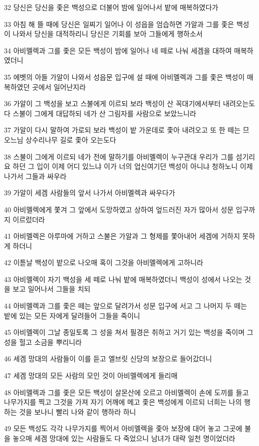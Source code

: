 \par 32 당신은 당신을 좇은 백성으로 더불어 밤에 일어나서 밭에 매복하였다가
\par 33 아침 해 뜰 때에 당신은 일찌기 일어나 이 성읍을 엄습하면 가알과 그를 좇은 백성이 나와서 당신을 대적하리니 당신은 기회를 보아 그들에게 행하소서
\par 34 아비멜렉과 그를 좇은 모든 백성이 밤에 일어나 네 떼로 나눠 세겜을 대하여 매복하였더니
\par 35 에벳의 아들 가알이 나와서 성읍문 입구에 설 때에 아비멜렉과 그를 좇은 백성이 매복하였던 곳에서 일어난지라
\par 36 가알이 그 백성을 보고 스불에게 이르되 보라 백성이 산 꼭대기에서부터 내려오는도다 스불이 그에게 대답하되 네가 산 그림자를 사람으로 보았느니라
\par 37 가알이 다시 말하여 가로되 보라 백성이 밭 가운데로 좇아 내려오고 또 한 떼는 므오느님 상수리나무 길로 좇아 오는도다
\par 38 스불이 그에게 이르되 네가 전에 말하기를 아비멜렉이 누구관대 우리가 그를 섬기리요 하던 그 입이 이제 어디 있느냐 이가 너의 업신여기던 백성이 아니냐 청하노니 이제 나가서 그들과 싸우라
\par 39 가알이 세겜 사람들의 앞서 나가서 아비멜렉과 싸우다가
\par 40 아비멜렉에게 쫓겨 그 앞에서 도망하였고 상하여 엎드러진 자가 많아서 성문 입구까지 이르렀더라
\par 41 아비멜렉은 아루마에 거하고 스불은 가알과 그 형제를 쫓아내어 세겜에 거하지 못하게 하더니
\par 42 이튿날 백성이 밭으로 나오매 혹이 그것을 아비멜렉에게 고하니라
\par 43 아비멜렉이 자기 백성을 세 떼로 나눠 밭에 매복하였더니 백성이 성에서 나오는 것을 보고 일어나서 그들을 치되
\par 44 아비멜렉과 그를 좇은 떼는 앞으로 달려가서 성문 입구에 서고 그 나머지 두 떼는 밭에 있는 모든 자에게 달려들어 그들을 죽이니
\par 45 아비멜렉이 그날 종일토록 그 성을 쳐서 필경은 취하고 거기 있는 백성을 죽이며 그 성을 헐고 소금을 뿌리니라
\par 46 세겜 망대의 사람들이 이를 듣고 엘브릿 신당의 보장으로 들어갔더니
\par 47 세겜 망대의 모든 사람의 모인 것이 아비멜렉에게 들리매
\par 48 아비멜렉과 그를 좇은 모든 백성이 살몬산에 오르고 아비멜렉이 손에 도끼를 들고 나무가지를 찍고 그것을 가져 자기 어깨에 메고 좇은 백성에게 이르되 너희는 나의 행하는 것을 보나니 빨리 나와 같이 행하라 하니
\par 49 모든 백성도 각각 나무가지를 찍어서 아비멜렉을 좇아 보장에 대어 놓고 그곳에 불을 놓으매 세겜 망대에 있는 사람들도 다 죽었으니 남녀가 대략 일천 명이었더라
